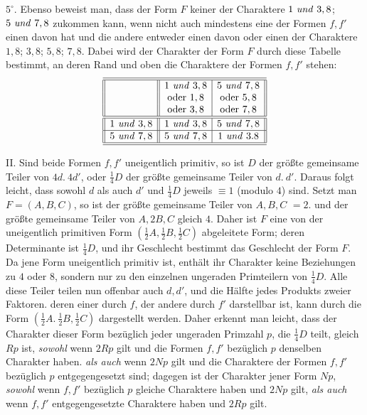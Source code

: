 $5^{\circ}$. Ebenso beweist man, dass der Form $F$ keiner der Charaktere $1\text{ \textit{und} }3,8$; $5\text{ \textit{und} }7,8$ zukommen kann, wenn nicht auch mindestens eine der Formen $f,f'$ einen davon hat und die andere entweder einen davon oder einen der Charaktere $1,8$; $3,8$; $5,8$; $7,8$.
Dabei wird der Charakter der Form $F$ durch diese Tabelle bestimmt, an deren Rand und oben die Charaktere der Formen $f,f'$ stehen:
\[
\begin{array}{||c||c|c||}
\hline\hline
 & 1\text{ \textit{und} }3,8 & 5\text{ \textit{und} }7,8 \\
 & \text{oder }1,8 & \text{oder }5,8 \\
 & \text{oder }3,8 & \text{oder }7,8 \\
\hline\hline
1\text{ \textit{und} }3,8 & 1\text{ \textit{und} }3,8 & 5\text{ \textit{und} }7,8 \\
\hline
5\text{ \textit{und} }7,8 & 5\text{ \textit{und} }7,8 & 1\text{ \textit{und} }3.8 \\
\hline\hline
\end{array}
\]

II. Sind beide Formen $f,f'$ uneigentlich primitiv, so ist $D$ der größte gemeinsame Teiler von $4d.\ 4d'$, oder $\frac{1}{4}D$ der größte gemeinsame Teiler von $d.\ d'$. Daraus folgt leicht, dass sowohl $d$ als auch $d'$ und $\frac{1}{4}D$ jeweils $\equiv1$ (modulo $4$) sind. Setzt man $F=(A,B,C)$, so ist der größte gemeinsame Teiler von $A,B,C$ $=2$. und der größte gemeinsame Teiler von $A,2B,C$ gleich $4$. Daher ist $F$ eine von der uneigentlich primitiven Form $(\frac{1}{2}A,\frac{1}{2}B,\frac{1}{2}C)$ abgeleitete Form; deren Determinante ist $\frac{1}{4}D$, und ihr Geschlecht bestimmt das Geschlecht der Form $F$. Da jene Form uneigentlich primitiv ist, enthält ihr Charakter keine Beziehungen zu $4$ oder $8$, sondern nur zu den einzelnen ungeraden Primteilern von $\frac{1}{4}D$. Alle diese Teiler teilen nun offenbar auch $d,d'$, und die Hälfte jedes Produkts zweier Faktoren. deren einer durch $f$, der andere durch $f'$ darstellbar ist, kann durch die Form $(\frac{1}{2}A.\ \frac{1}{2}B,\frac{1}{2}C)$ dargestellt werden. Daher erkennt man leicht, dass der Charakter dieser Form bezüglich jeder ungeraden Primzahl $p$, die $\frac{1}{4}D$ teilt, gleich $Rp$ ist, \textit{sowohl} wenn $2Rp$ gilt und die Formen $f,f'$ bezüglich $p$ denselben Charakter haben. \textit{als auch} wenn $2Np$ gilt und die Charaktere der Formen $f,f'$ bezüglich $p$ entgegengesetzt sind; dagegen ist der Charakter jener Form $Np$, \textit{sowohl} wenn $f,f'$ bezüglich $p$ gleiche Charaktere haben und $2Np$ gilt, \textit{als auch} wenn $f,f'$ entgegengesetzte Charaktere haben und $2Rp$ gilt.

